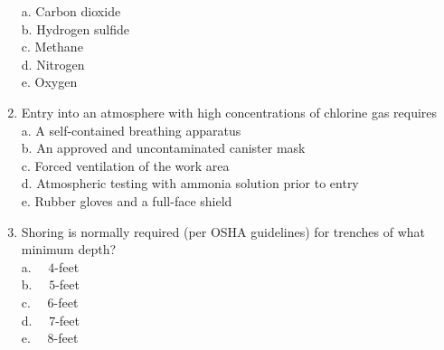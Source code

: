\begin{enumerate}[1.]
a. Carbon dioxide\\
b. Hydrogen sulfide\\
c. Methane\\
d. Nitrogen\\
e. Oxygen\\
  \item Entry into an atmosphere with high concentrations of chlorine gas requires\\
a. A self-contained breathing apparatus\\
b. An approved and uncontaminated canister mask\\
c. Forced ventilation of the work area\\
d. Atmospheric testing with ammonia solution prior to entry\\
e. Rubber gloves and a full-face shield

\item Shoring is normally required (per OSHA guidelines) for trenches of what minimum depth?\\
a. $\quad 4$-feet\\
b. $\quad 5$-feet\\
c. $\quad 6$-feet\\
d. $\quad 7$-feet\\
e. $\quad 8$-feet\\


\end{enumerate}
